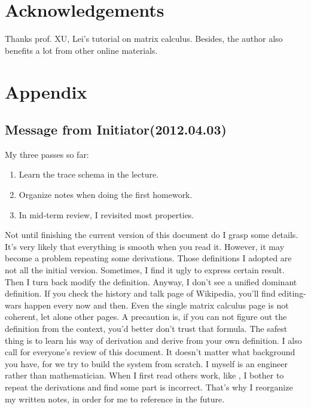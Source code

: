 \section*{Acknowledgements}
Thanks prof. XU, Lei's tutorial on matrix calculus\cite{xu2012-mlt}. 
Besides, the author also benefits a lot from other online 
materials. 



\section*{Appendix}

\subsection*{Message from Initiator(2012.04.03)}

My three passes so far:
\begin{enumerate}
	\item Learn the trace schema in the lecture. 
	\item Organize notes when doing the first homework. 
	\item In mid-term review, I revisited most properties. 
\end{enumerate}
Not until finishing the current version of this document do 
I grasp some details. It's very likely that everything is 
smooth when you read it. However, it may become a problem
repeating some derivations. Those definitions I adopted 
are not all the initial version. Sometimes, I find it ugly 
to express certain result. Then I turn back modify the definition. 
Anyway, I don't see a unified dominant definition. If you check 
the history and talk page of Wikipedia\cite{wiki_mc}, you'll find editing-wars
happen every now and then. Even the single matrix calculus page
is not coherent\cite{wiki_mc}, let alone other pages. A precaution 
is, if you can not figure out the definition from the context, 
you'd better don't trust that formula. The safest thing is to learn
his way of derivation and derive from your own definition. 
I also call for everyone's review of this document. It doesn't matter
what background you have, for we try to build the system from 
scratch. I myself is an engineer rather than mathematician. 
When I first read others work, like \cite{finite_appendix_mc}, 
I bother to repeat the derivations and find some part is 
incorrect. That's why I reorganize my written notes, 
in order for me to reference in the future. 

